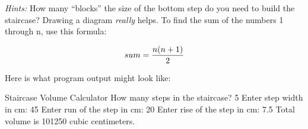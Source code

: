 \begin{exercise}
{\em Hints:} How many ``blocks'' the size of the bottom step do you need to build the staircase? Drawing a diagram {\em really} helps. To find the sum of the numbers 1 through n, use this formula: 

\begin{equation*}
sum = {{n(n+1)}\over 2}
\end{equation*}

Here is what program output might look like:

\begin{stdout}
Staircase Volume Calculator
How many steps in the staircase? 5
Enter step width in cm: 45
Enter run of the step in cm: 20
Enter rise of the step in cm: 7.5
Total volume is 101250 cubic centimeters.
\end{stdout}
\end{exercise}


